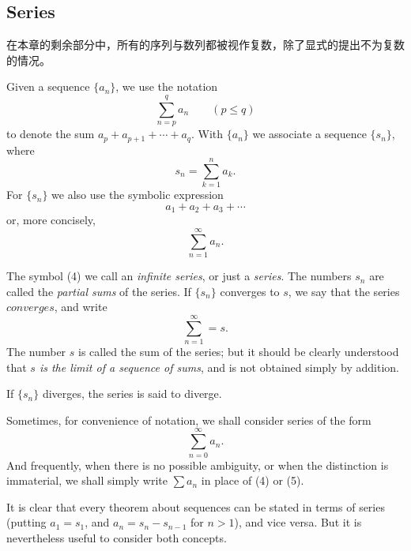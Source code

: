 \documentclass[../poma-notes.tex]{subfiles}
\begin{document}
\subsection*{Series}

在本章的剩余部分中，所有的序列与数列都被视作复数，除了显式的提出不为复数的情况。

\begin{definition}
  Given a sequence $\{a_n\}$, we use the notation
  \[ \sum_{n=p}^{q} a_n \qquad (p \le q) \]
  to denote the sum $ a_p + a_{p+1} + \cdots + a_q$. With $\{a_n\}$ we associate a sequence $\{s_n\}$, where
  \[ s_n = \sum_{k=1}^{n} a_k. \]
  For $\{s_n\}$ we also use the symbolic expression
  \[ a_1 + a_2 + a_3 + \cdots \]
  or, more concisely,
  \begin{equation}
    \sum_{n=1}^{\infty} a_n.
  \end{equation}

  The symbol (4) we call an \textit{infinite series}, or just a \textit{series}. The numbers $s_n$ are called
  the \textit{partial sums} of the series. If $\{s_n\}$ converges to $s$, we say that the series $converges$,
  and write
  \[ \sum_{n=1}^{\infty} = s. \]
  The number $s$ is called the sum of the series; but it should be clearly understood that \textit{$s$ is the
    limit of a sequence of sums}, and is not obtained simply by addition.

  If $\{s_n\}$ diverges, the series is said to diverge.

  Sometimes, for convenience of notation, we shall consider series of the form
  \begin{equation}
    \sum_{n=0}^{\infty} a_n.
  \end{equation}
  And frequently, when there is no possible ambiguity, or when the distinction is immaterial, we shall simply
  write $\sum a_n$ in place of (4) or (5).

  It is clear that every theorem about sequences can be stated in terms of series (putting $a_1 = s_1$, and
  $a_n = s_n - s_{n-1}$ for $n > 1$), and vice versa. But it is nevertheless useful to consider both concepts.
\end{definition}
\end{document}
